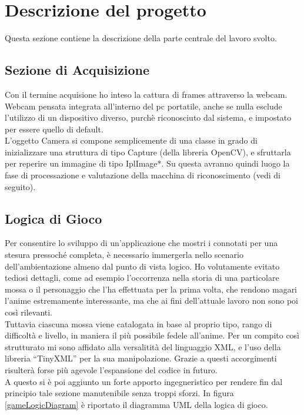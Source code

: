 \documentclass[a4paper,10pt, twocolumn]{article}
\begin{document}
  
\section{Descrizione del progetto}
Questa sezione contiene la descrizione della parte centrale del lavoro svolto.

  \subsection{Sezione di Acquisizione} 
  Con il termine acquisione ho inteso la cattura di frames attraverso la webcam.
  Webcam pensata integrata all'interno del pc portatile, anche se nulla esclude 
  l'utilizzo di un dispositivo diverso, purch\`{e} riconosciuto dal sistema, e
  impostato per essere quello di default.\\
  L'oggetto Camera si compone semplicemente di una
  classe in grado di inizializzare una struttura di tipo Capture (della libreria OpenCV),
  e sfruttarla per reperire un immagine di tipo IplImage*. Su questa avranno quindi
  luogo la fase di processazione e valutazione della macchina di riconoscimento
  (vedi di seguito).	
  
  \subsection{Logica di Gioco}
  Per consentire lo sviluppo di un'applicazione che mostri i connotati per una stesura 
  pressoch\'{e}  completa, 
  \`{e} necessario immergerla nello scenario dell'ambientazione almeno dal punto 
  di vista logico. Ho volutamente evitato tediosi dettagli, come ad esempio l'occorrenza nella
  storia
  di una particolare mossa o il personaggio che l'ha effettuata per la prima volta,
  che rendono magari
  l'anime estremamente interessante, 
  ma che ai fini dell'attuale
  lavoro non sono poi cos\`{i} rilevanti.\\
  Tuttavia ciascuna mossa viene catalogata in base al proprio tipo, rango di difficolt\`{a} e 
  livello, in maniera il pi\`{u} possibile fedele all'anime. Per un compito cos\`{i}
  strutturato mi sono affidato alla versalitit\`{a} del linguaggio XML, e l'uso della libreria
  ``TinyXML'' \cite{tinyXml} per la sua manipolazione. Grazie a questi accorgimenti 
  risulter\`{a} forse pi\`{u} agevole l'espansione del codice in futuro.\\
  A questo si \`{e} poi aggiunto un forte apporto ingegneristico per rendere fin dal 
  principio tale sezione manutenibile senza troppi sforzi.
  In figura \ref{gameLogicDiagram} \`{e} riportato il diagramma UML della logica di gioco.
   
\end{document}
